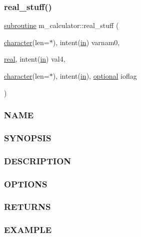 \subsubsection{\texorpdfstring{real\+\_\+stuff()}{real\_stuff()}}
{\footnotesize\ttfamily \hyperlink{M__stopwatch_83_8txt_acfbcff50169d691ff02d4a123ed70482}{subroutine} m\+\_\+calculator\+::real\+\_\+stuff (\begin{DoxyParamCaption}\item[{\hyperlink{option__stopwatch_83_8txt_abd4b21fbbd175834027b5224bfe97e66}{character}(len=$\ast$), intent(\hyperlink{M__journal_83_8txt_afce72651d1eed785a2132bee863b2f38}{in})}]{varnam0,  }\item[{\hyperlink{read__watch_83_8txt_abdb62bde002f38ef75f810d3a905a823}{real}, intent(\hyperlink{M__journal_83_8txt_afce72651d1eed785a2132bee863b2f38}{in})}]{val4,  }\item[{\hyperlink{option__stopwatch_83_8txt_abd4b21fbbd175834027b5224bfe97e66}{character}(len=$\ast$), intent(\hyperlink{M__journal_83_8txt_afce72651d1eed785a2132bee863b2f38}{in}), \hyperlink{option__stopwatch_83_8txt_aa4ece75e7acf58a4843f70fe18c3ade5}{optional}}]{ioflag }\end{DoxyParamCaption})\hspace{0.3cm}{\ttfamily [private]}}



\subsubsection*{N\+A\+ME}

\subsubsection*{S\+Y\+N\+O\+P\+S\+IS}

\subsubsection*{D\+E\+S\+C\+R\+I\+P\+T\+I\+ON}

\subsubsection*{O\+P\+T\+I\+O\+NS}

\subsubsection*{R\+E\+T\+U\+R\+NS}

\subsubsection*{E\+X\+A\+M\+P\+LE}

